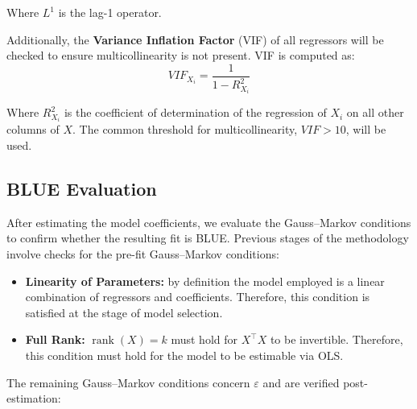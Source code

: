 \noindent Where $L^1$ is the lag-1 operator.

\vspace{\baselineskip}

Additionally, the \textbf{Variance Inflation Factor} (VIF) of all regressors will be checked to ensure multicollinearity is not present.
VIF is computed as:
\begin{equation}
    \label{eq:vif}
    VIF_{X_i} = \frac{1}{1 - R^2_{X_i}}
\end{equation}

\noindent Where $R^2_{X_i}$ is the coefficient of determination of the regression of $X_i$ on all other columns of $X$.
The common threshold for multicollinearity, $VIF > 10$, will be used.

\subsection{BLUE Evaluation}\label{subsec:blue_evaluation}

After estimating the model coefficients, we evaluate the Gauss--Markov conditions to confirm whether the resulting fit is BLUE.
Previous stages of the methodology involve checks for the pre-fit Gauss--Markov conditions:
\begin{itemize}
    \item \textbf{Linearity of Parameters:} by definition the model employed is a linear combination of regressors and coefficients.
    Therefore, this condition is satisfied at the stage of model selection.
    \item \textbf{Full Rank:} $\operatorname{rank}(X)=k$ must hold for $X^\top X$ to be invertible. 
    Therefore, this condition must hold for the model to be estimable via OLS.
\end{itemize}

\noindent The remaining Gauss--Markov conditions concern $\varepsilon$ and are verified post-estimation:


